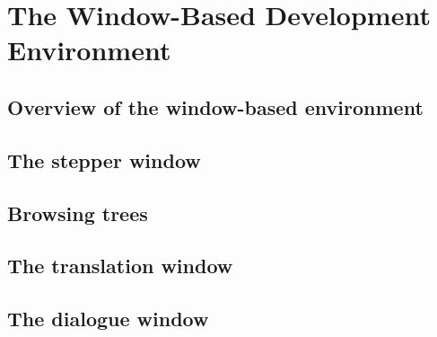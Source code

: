 \chapter{The Window-Based Development Environment}
\label{Chapter:RegulusGUI}

\author{Elisabeth Kron and Manny Rayner}

\section{Overview of the window-based environment}
\label{Section:RegulusGUIOverview}

\section{The stepper window}
\label{Section:StepperWindow}

\section{Browsing trees}
\label{Section:TreeWindow}

\section{The translation window}
\label{Section:TranslationWindow}

\section{The dialogue window}
\label{Section:DialogueWindow}


